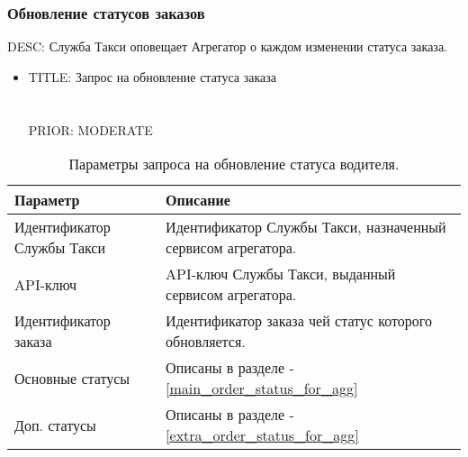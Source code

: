         \subsubsection{Обновление статусов заказов}

        	DESC: Служба Такси оповещает Агрегатор о каждом изменении статуса заказа. 

        	\begin{itemize}

				\item{
					TITLE: Запрос на обновление статуса заказа\\
					\\
					\\
					PRIOR: MODERATE\\
				}

			\end{itemize}


			\begin{table}[h]
	            \begin{center}
	            \label{change_order_status_request_parametrs}
	            \caption {Параметры запроса на обновление статуса водителя.}
	            \setlength{\extrarowheight}{2mm}
	            \begin{tabular}{|p{5cm}|p{10cm}|}
	               \hline     \textbf{Параметр}&\textbf{Описание} \\ [2mm]


	               \hline Идентификатор Службы Такси & Идентификатор Службы Такси, назначенный сервисом агрегатора.\\ [2mm]

	               \hline API-ключ & API-ключ Службы Такси, выданный сервисом агрегатора.\\ [2mm]

	               \hline Идентификатор заказа & Идентификатор заказа чей статус которого обновляется.\\ [2mm]

	               \hline Основные статусы & Описаны в разделе - \ref{main_order_status_for_agg}\\ [2mm]

	               \hline Доп. статусы & Описаны в разделе - \ref{extra_order_status_for_agg} \\ [2mm]

	               \hline
	            \end{tabular}
	            \end{center}
            \end{table}

